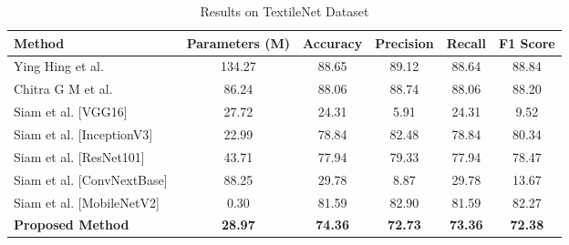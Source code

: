 \begin{table}[h]
\centering
\caption{Results on TextileNet Dataset}
\label{tab:textilenet_results}
\begin{adjustbox}{max width=\textwidth}
\begin{tabular}{lccccc}
\toprule
\textbf{Method} & \textbf{Parameters (M)} & \textbf{Accuracy} & \textbf{Precision} & \textbf{Recall} & \textbf{F1 Score} \\
\midrule
Ying Hing et al.~\cite{hong2024research} & 134.27 & 88.65 & 89.12 & 88.64 & 88.84 \\
Chitra G M et al.~\cite{chitra2023fabric} & 86.24 & 88.06 & 88.74 & 88.06 & 88.20 \\
Siam et al. [VGG16]~\cite{siam2023textilenet} & 27.72 & 24.31 & 5.91 & 24.31 & 9.52 \\
Siam et al. [InceptionV3]~\cite{siam2023textilenet} & 22.99 & 78.84 & 82.48 & 78.84 & 80.34 \\
Siam et al. [ResNet101]~\cite{siam2023textilenet} & 43.71 & 77.94 & 79.33 & 77.94 & 78.47 \\
Siam et al. [ConvNextBase]~\cite{siam2023textilenet} & 88.25 & 29.78 & 8.87 & 29.78 & 13.67 \\
Siam et al. [MobileNetV2]~\cite{siam2023textilenet} & 0.30 & 81.59 & 82.90 & 81.59 & 82.27 \\
\textbf{Proposed Method} & \textbf{28.97} & \textbf{74.36} & \textbf{72.73} & \textbf{73.36} & \textbf{72.38} \\
\bottomrule
\end{tabular}
\end{adjustbox}
\end{table}